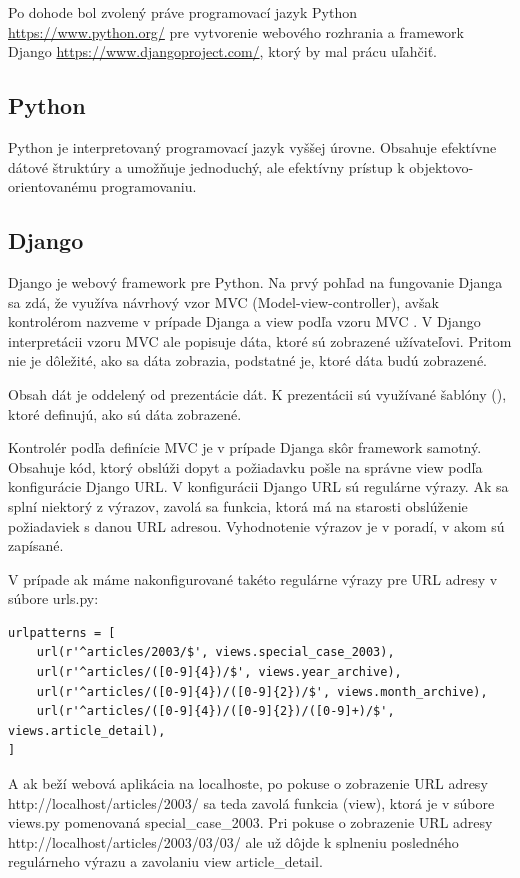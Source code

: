 \documentclass[thesis=M,slovak]{FITthesis}[2013/05/06]
\begin{document}
Po dohode bol zvolený práve programovací jazyk Python \url{https://www.python.org/} pre vytvorenie webového rozhrania a framework Django \url{https://www.djangoproject.com/}, ktorý by mal prácu uľahčiť.

\subsection{Python}
Python je interpretovaný programovací jazyk vyššej úrovne. Obsahuje efektívne dátové štruktúry a umožňuje jednoduchý, ale efektívny prístup k objektovo-orientovanému programovaniu. \cite{Python}

\subsection{Django}
Django je webový framework pre Python. Na prvý pohľad na fungovanie Djanga sa zdá, že využíva návrhový vzor MVC (Model-view-controller), \mbox{avšak} kontrolérom nazveme v prípade Djanga  a view podľa vzoru MVC . V Django interpretácii vzoru MVC ale  popisuje dáta, ktoré sú zobrazené užívateľovi. Pritom nie je dôležité, ako sa dáta zobrazia, podstatné je, ktoré dáta budú zobrazené.

Obsah dát je oddelený od prezentácie dát. K prezentácii sú využívané šablóny (), ktoré definujú, ako sú dáta zobrazené.

Kontrolér podľa definície MVC je v prípade Djanga skôr framework samotný. Obsahuje kód, ktorý obslúži dopyt a požiadavku pošle na správne view podľa konfigurácie Django URL. V konfigurácii Django URL sú regulárne výrazy. Ak sa splní niektorý z výrazov, zavolá sa funkcia, ktorá má na starosti obslúženie požiadaviek s danou URL adresou. Vyhodnotenie výrazov je v poradí, v akom sú zapísané.

V prípade ak máme nakonfigurované takéto regulárne výrazy pre URL adresy v súbore urls.py:
\begin{lstlisting}[frame=single] 
urlpatterns = [
    url(r'^articles/2003/$', views.special_case_2003),
    url(r'^articles/([0-9]{4})/$', views.year_archive),
    url(r'^articles/([0-9]{4})/([0-9]{2})/$', views.month_archive),
    url(r'^articles/([0-9]{4})/([0-9]{2})/([0-9]+)/$', views.article_detail),
]
\end{lstlisting}
A ak beží webová aplikácia na localhoste, po pokuse o zobrazenie URL adresy http://localhost/articles/2003/ sa teda zavolá funkcia (view), ktorá je v súbore views.py pomenovaná special\_case\_2003. Pri pokuse o zobrazenie URL adresy http://localhost/articles/2003/03/03/ ale už dôjde k splneniu posledného regulárneho výrazu a zavolaniu view article\_detail.
\end{document}
